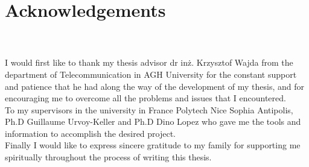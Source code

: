 


\begingroup

\chapter*{Acknowledgements}
\\
\\

I would first like to thank my thesis advisor dr inż. Krzysztof Wajda from the department of Telecommunication in AGH University for the constant support and patience that he had along the way of the development of my thesis, and for encouraging me to overcome all the problems and issues that I encountered.\\

To my supervisors in the university in France Polytech Nice Sophia Antipolis, Ph.D Guillaume Urvoy-Keller and Ph.D Dino Lopez who gave me the tools and information to accomplish the desired project.\\

Finally I would like to express sincere gratitude to my family for supporting me spiritually throughout the process of writing this thesis.\\

\endgroup
\vfill